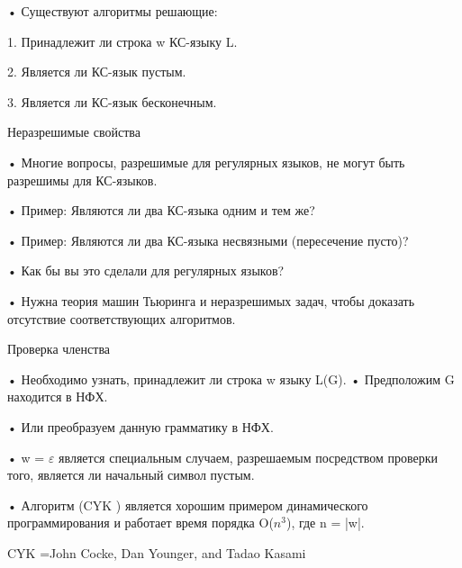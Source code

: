 \documentclass{article}
\begin{document}
• Существуют алгоритмы решающие:

1. Принадлежит ли строка w КС-языку L.

2. Является ли КС-язык пустым.

3. Является ли КС-язык бесконечным.

Неразрешимые свойства

• Многие вопросы, разрешимые для регулярных языков, не
могут быть разрешимы для КС-языков.

• Пример: Являются ли два КС-языка одним и тем же?

• Пример: Являются ли два КС-языка несвязными (пересечение
пусто)?

• Как бы вы это сделали для регулярных языков?

• Нужна теория машин Тьюринга и неразрешимых задач, чтобы
доказать отсутствие соответствующих алгоритмов.

Проверка членства

• Необходимо узнать, принадлежит ли строка w языку L(G).
• Предположим G находится в НФХ.

• Или преобразуем данную грамматику в НФХ.

• w = $\varepsilon $ является специальным случаем, разрешаемым
посредством проверки того, является ли начальный символ
пустым.

• Алгоритм (CYK ) является хорошим примером
динамического программирования и работает время
порядка O($n^3$), где n = |w|.

CYK =John Cocke, Dan Younger, and Tadao Kasami
\end{document}
